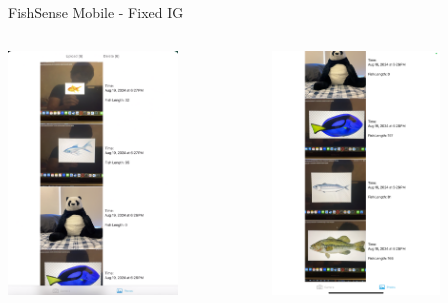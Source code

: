 \begin{frame}{FishSense Mobile - Fixed IG}
    \begin{columns}
        \begin{column}{0.5\textwidth}
            \centering
            \includegraphics[height=0.8\textheight,width=0.7\textwidth,keepaspectratio]{images/fs_ipad1.png}
        \end{column}
        \begin{column}{0.5\textwidth}
            \centering
            \includegraphics[height=0.8\textheight,width=0.7\textwidth,keepaspectratio]{images/fs_ipad2.jpeg}
        \end{column}
    \end{columns}
\end{frame}

